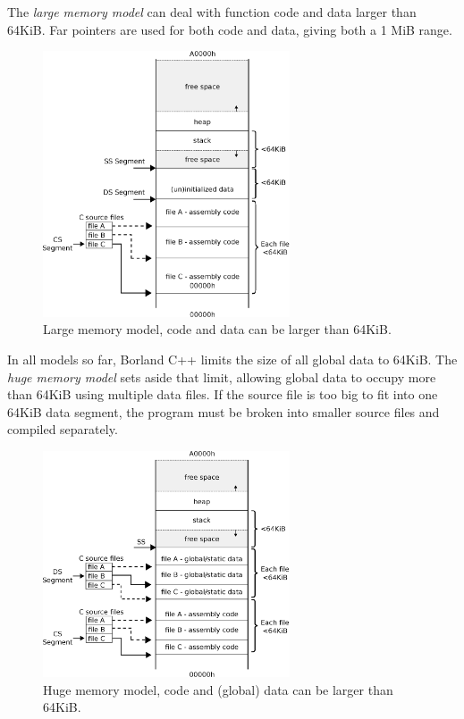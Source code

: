 \documentclass[book.tex]{subfiles}
\begin{document}
\pagebreak
The \textit{large memory model} can deal with function code and data larger than 64KiB. Far pointers are used for both code and data, giving both a 1 MiB range.
\begin{figure}[H]
\centering
\includegraphics[width=0.65\textwidth]{imgs/drawings/memory/large_mm.eps}
\caption{Large memory model, code and data can be larger than 64KiB.}
\label{fig:mm_large}
\end{figure}


\pagebreak
In all models so far, Borland C++ limits the size of all global data to 64KiB. The \textit{huge memory model} sets aside that limit, allowing global data to occupy more than 64KiB using multiple data files. If the source file is too big to fit into one 64KiB data segment, the program must be broken into smaller source files and compiled separately.\\
\begin{figure}[H]
\centering
\includegraphics[width=0.65\textwidth]{imgs/drawings/memory/huge_mm.eps}
\caption{Huge memory model, code and (global) data can be larger than 64KiB.}
\label{fig:mm_large}
\end{figure}

\end{document}
